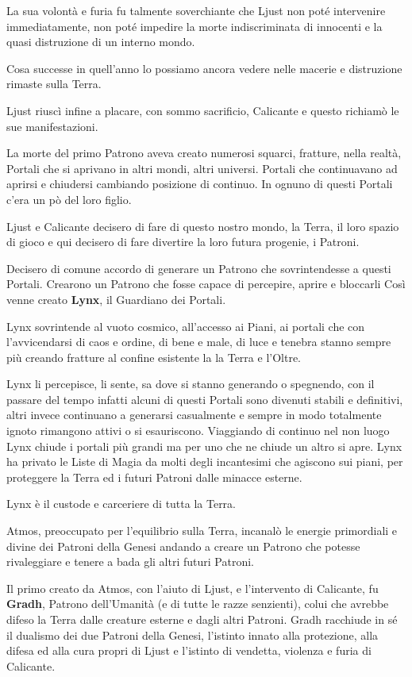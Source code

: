 \begin{multicols}{2}
La sua volontà e furia fu talmente soverchiante che Ljust non poté intervenire immediatamente, non poté impedire la morte indiscriminata di innocenti e la quasi distruzione di un interno mondo.

Cosa successe in quell'anno lo possiamo ancora vedere nelle macerie e distruzione rimaste sulla Terra.

Ljust riuscì infine a placare, con sommo sacrificio, Calicante e questo richiamò le sue manifestazioni.

La morte del primo Patrono aveva creato numerosi squarci, fratture, nella realtà, Portali che si aprivano in altri mondi, altri universi. Portali che continuavano ad aprirsi e chiudersi cambiando posizione di continuo. In ognuno di questi Portali c'era un pò del loro figlio.

Ljust e Calicante decisero di fare di questo nostro mondo, la Terra, il loro spazio di gioco e qui decisero di fare divertire la loro futura progenie, i Patroni.

Decisero di comune accordo di generare un Patrono che sovrintendesse a questi Portali. Crearono un Patrono che fosse capace di percepire, aprire e bloccarli Così venne creato \textbf{Lynx}, il Guardiano dei Portali.

Lynx sovrintende al vuoto cosmico, all'accesso ai Piani, ai portali che con l'avvicendarsi di caos e ordine, di bene e male, di luce e tenebra stanno sempre più creando fratture al confine esistente la la Terra e l'Oltre.

Lynx li percepisce, li sente, sa dove si stanno generando o spegnendo, con il passare del tempo infatti alcuni di questi Portali sono divenuti stabili e definitivi, altri invece continuano a generarsi casualmente e sempre in modo totalmente ignoto rimangono attivi o si esauriscono. Viaggiando di continuo nel non luogo Lynx chiude i portali più grandi ma per uno che ne chiude un altro si apre. Lynx ha privato le Liste di Magia da molti degli incantesimi che agiscono sui piani, per proteggere la Terra ed i futuri Patroni dalle minacce esterne.

Lynx è il custode e carceriere di tutta la Terra.

Atmos, preoccupato per l'equilibrio sulla Terra, incanalò le energie primordiali e divine dei Patroni della Genesi andando a creare un Patrono che potesse rivaleggiare e tenere a bada gli altri futuri Patroni.

Il primo creato da Atmos, con l'aiuto di Ljust, e l'intervento di Calicante, fu \textbf{Gradh}, Patrono dell'Umanità (e di tutte le razze senzienti), colui che avrebbe difeso la Terra dalle creature esterne e dagli altri Patroni. Gradh racchiude in sé il dualismo dei due Patroni della Genesi, l'istinto innato alla protezione, alla difesa ed alla cura propri di Ljust e l'istinto di vendetta, violenza e furia di Calicante.


\end{multicols}
